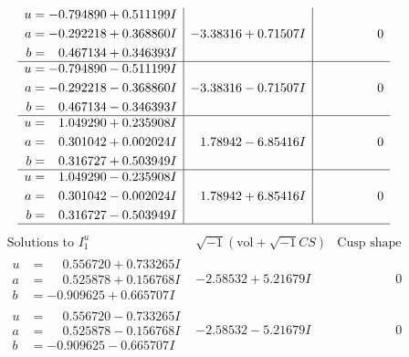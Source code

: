 \documentclass[1p]{elsarticle_modified}
\theoremstyle{definition}
\newcommand{\I}{\sqrt{-1}}
\begin{document}
$$\begin{array}{c|c|c}
\begin{aligned}
u &= -0.794890 + 0.511199 I \\
a &= -0.292218 + 0.368860 I \\
b &= \phantom{-}0.467134 + 0.346393 I\end{aligned}
 & -3.38316 + 0.71507 I & \phantom{-0.000000 } 0 \\ \hline\begin{aligned}
u &= -0.794890 - 0.511199 I \\
a &= -0.292218 - 0.368860 I \\
b &= \phantom{-}0.467134 - 0.346393 I\end{aligned}
 & -3.38316 - 0.71507 I & \phantom{-0.000000 } 0 \\ \hline\begin{aligned}
u &= \phantom{-}1.049290 + 0.235908 I \\
a &= \phantom{-}0.301042 + 0.002024 I \\
b &= \phantom{-}0.316727 + 0.503949 I\end{aligned}
 & \phantom{-}1.78942 - 6.85416 I & \phantom{-0.000000 } 0 \\ \hline\begin{aligned}
u &= \phantom{-}1.049290 - 0.235908 I \\
a &= \phantom{-}0.301042 - 0.002024 I \\
b &= \phantom{-}0.316727 - 0.503949 I\end{aligned}
 & \phantom{-}1.78942 + 6.85416 I & \phantom{-0.000000 } 0\\
 \hline 
 \end{array}$$\newpage$$\begin{array}{c|c|c}  
\text{Solutions to }I^u_{1}& \I (\text{vol} + \sqrt{-1}CS) & \text{Cusp shape}\\
 \hline 
\begin{aligned}
u &= \phantom{-}0.556720 + 0.733265 I \\
a &= \phantom{-}0.525878 + 0.156768 I \\
b &= -0.909625 + 0.665707 I\end{aligned}
 & -2.58532 + 5.21679 I & \phantom{-0.000000 } 0 \\ \hline\begin{aligned}
u &= \phantom{-}0.556720 - 0.733265 I \\
a &= \phantom{-}0.525878 - 0.156768 I \\
b &= -0.909625 - 0.665707 I\end{aligned}
 & -2.58532 - 5.21679 I & \phantom{-0.000000 } 0 \\ \hline\begin{aligned}

\end{aligned}
\end{array}$$
\end{document}
